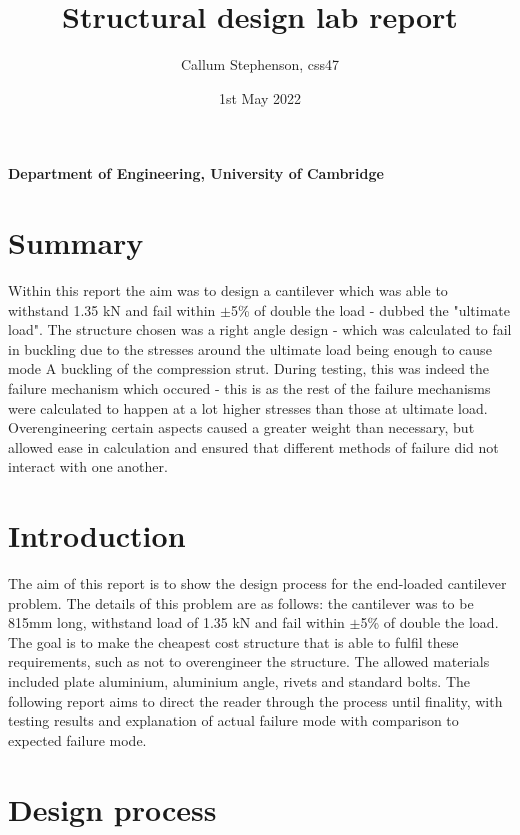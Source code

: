\documentclass[12pt]{article}
\title{\textbf{Structural design lab report}}
\author{Callum Stephenson, css47}
\date{1st May 2022}
\begin{document}
    \begin{titlepage}
        \maketitle
        \thispagestyle{empty}
        \vspace{13cm}
        \textbf{Department of Engineering, University of Cambridge}
    \end{titlepage}
    \newpage
    \tableofcontents
    \newpage
    \section{Summary}
        Within this report the aim was to design a cantilever which was able to withstand 1.35 kN and fail within $\pm$5\% of double the load - dubbed the "ultimate load". 
        The structure chosen was a right angle design - which was calculated to fail in buckling due to the stresses around the ultimate load being enough to cause mode A buckling
        of the compression strut. During testing, this was indeed the failure mechanism which occured - this is as the rest of the failure mechanisms were calculated to happen at a lot
        higher stresses than those at ultimate load. Overengineering certain aspects caused a greater weight than necessary, but allowed ease in calculation and ensured that 
        different methods of failure did not interact with one another. 
    \section{Introduction}
        The aim of this report is to show the design process for the end-loaded cantilever problem. The details of this problem are as follows:
        the cantilever was to be 815mm long, withstand load of 1.35 kN and fail within $\pm$5\% of double the load. The goal is to make the cheapest
        cost structure that is able to fulfil these requirements, such as not to overengineer the structure. The allowed materials included plate aluminium,
        aluminium angle, rivets and standard bolts. The following report aims to direct the reader through the process until finality, with testing results
        and explanation of actual failure mode with comparison to expected failure mode.
    \section{Design process}
\end{document}
